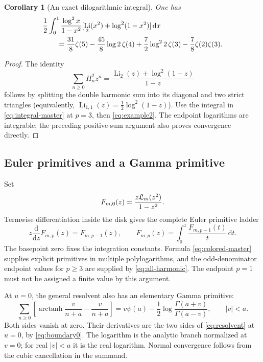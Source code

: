 \documentclass[11pt,a4paper]{article}
\numberwithin{equation}{section}
\newtheorem{corollary}[theorem]{Corollary}
\theoremstyle{definition}\newtheorem{definition}[theorem]{Definition}
\theoremstyle{remark}\newtheorem{remark}[theorem]{Remark}
\DeclareMathOperator{\Li}{Li}
\DeclareMathOperator{\arctanh}{arctanh}
\newcommand{\dd}{\,\mathrm d}
\begin{document}
\begin{corollary}[An exact dilogarithmic integral]
\label{cor:dilog-integral}
One has
\begin{align}
 &\frac12\int_0^1\frac{\log^2x}{1-x^2}
          [\Li_2(x^2)+\log^2(1-x^2)]\dd x\notag\\
 &\qquad=\frac{31}{8}\zeta(5)-\frac{45}{8}\log2\,\zeta(4)
       +\frac72\log^22\,\zeta(3)-\frac78\zeta(2)\zeta(3).
 \label{eq:dilog-integral}
\end{align}
\end{corollary}
\begin{proof}
The identity
\[
 \sum_{n\ge0}H_n^2z^n=
 \frac{\Li_2(z)+\log^2(1-z)}{1-z}
\]
follows by splitting the double harmonic sum into its diagonal and
two strict triangles (equivalently, $\Li_{1,1}(z)=\tfrac12\log^2(1-z)$).
Use the integral in \eqref{eq:integral-master} at $p=3$, then
\eqref{eq:example2}. The endpoint logarithms are integrable; the
preceding positive-sum argument also proves convergence directly.
\end{proof}

\subsection{Euler primitives and a Gamma primitive}
Set
\begin{equation}
 F_{m,0}(z)=\frac{z\mathfrak L_m(z^2)}{1-z^2}.
 \label{eq:Fm0}
\end{equation}
Termwise differentiation inside the disk gives the complete Euler
primitive ladder
\begin{equation}
 z\frac{\mathrm d}{\mathrm dz}F_{m,p}(z)=F_{m,p-1}(z),\qquad
 F_{m,p}(z)=\int_0^z\frac{F_{m,p-1}(t)}t\dd t.
 \label{eq:Euler-ladder}
\end{equation}
The basepoint zero fixes the integration constants. Formula
\eqref{eq:colored-master} supplies explicit primitives in multiple
polylogarithms, and the odd-denominator endpoint values for $p\ge3$
are supplied by \eqref{eq:all-harmonic}. The endpoint $p=1$ must not
be assigned a finite value by this argument.

At $u=0$, the general resolvent also has an elementary Gamma primitive:
\begin{equation}
 \sum_{n\ge0}\left[\arctanh\frac{v}{n+a}-\frac{v}{n+a}\right]
 =v\psi(a)-\frac12\log\frac{\Gamma(a+v)}{\Gamma(a-v)},
 \qquad |v|<a.
 \label{eq:gamma-primitive}
\end{equation}
Both sides vanish at zero. Their derivatives are the two sides of
\eqref{eq:resolvent} at $u=0$, by \eqref{eq:boundary0}.
The logarithm is the analytic branch normalized at $v=0$;
for real $|v|<a$ it is the real logarithm. Normal convergence follows
from the cubic cancellation in the summand.
\end{document}
